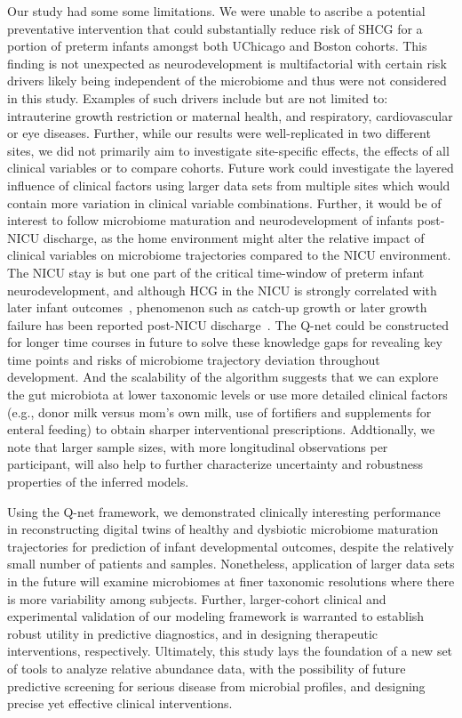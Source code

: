 \documentclass[onecolumn,10pt]{IEEEtran}
\def\qnet{Q-net\xspace}
\begin{document}
Our study had some some limitations. We were unable to ascribe a potential preventative intervention that could substantially reduce risk of SHCG for a portion of preterm infants amongst both UChicago and Boston cohorts. This finding is not unexpected as neurodevelopment is multifactorial with certain risk drivers likely being independent of the microbiome and thus were not considered in this study. Examples of such drivers include but are not limited to: intrauterine growth restriction or maternal health, and respiratory, cardiovascular or eye diseases\cite{zhao2021investigation,bae2022retinopathy}.  Further, while our results were well-replicated in two different sites, we did not primarily aim to investigate  site-specific effects,  the effects of all clinical variables or to compare cohorts. Future work could investigate the layered influence of clinical factors using larger data sets from multiple sites which would contain more variation in clinical variable combinations. Further, it would be of interest to follow microbiome maturation and neurodevelopment of infants post-NICU discharge, as the home environment might alter the relative impact of clinical variables on microbiome trajectories compared to the NICU environment. The NICU stay is but one part of the critical time-window of preterm infant neurodevelopment, and although HCG in the NICU is strongly correlated with later infant outcomes~\cite{cordova2020association}, phenomenon such as catch-up growth or later growth failure has been reported post-NICU discharge~\cite{raghuram2017canadian}. The \qnet could be constructed for longer time courses in future to solve these knowledge gaps for revealing key time points and risks of microbiome trajectory deviation throughout development. And the scalability of the algorithm suggests that we can explore the gut microbiota at lower taxonomic levels or use more detailed clinical factors (e.g., donor milk versus mom's own milk, use of fortifiers and supplements for enteral feeding) to obtain sharper interventional prescriptions. Addtionally, we note that larger sample sizes, with more longitudinal observations per participant, will also help to further characterize uncertainty and robustness properties of the inferred models.

Using the  \qnet framework, we demonstrated clinically interesting performance in reconstructing digital twins of healthy and dysbiotic microbiome maturation trajectories for prediction of infant developmental outcomes, despite the relatively small number of patients and samples. Nonetheless, application of larger data sets in the future will examine microbiomes at finer taxonomic resolutions where there is more variability among subjects. Further, larger-cohort clinical and experimental validation of our modeling framework is warranted to establish robust  utility  in predictive diagnostics, and in designing therapeutic interventions, respectively. Ultimately, this study lays the foundation of a new set of tools to analyze relative abundance data, with the possibility of future predictive screening for serious disease from microbial profiles, and designing precise yet effective clinical interventions.
\end{document}
